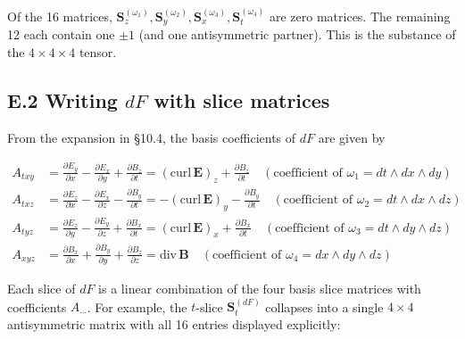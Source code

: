 \documentclass[a4paper,12pt,openany]{book}
\begin{document}
Of the 16 matrices,
\(\mathbf{S}_{z}^{(\omega_1)}, \mathbf{S}_{y}^{(\omega_2)}, \mathbf{S}_{x}^{(\omega_3)}, \mathbf{S}_{t}^{(\omega_4)}\)
are zero matrices. The remaining 12 each contain one \(\pm1\) (and one
antisymmetric partner). This is the substance of the \(4\times4\times4\)
tensor.

\hypertarget{e.2-writing-df-with-slice-matrices}{%
\subsection*{\texorpdfstring{E.2 Writing \(dF\) with slice
matrices}{E.2 Writing dF with slice matrices}}\label{e.2-writing-df-with-slice-matrices}}

From the expansion in §10.4, the basis coefficients of \(dF\) are given
by

\[
\begin{aligned}
A_{txy} &= \frac{\partial E_y}{\partial x} - \frac{\partial E_x}{\partial y} + \frac{\partial B_z}{\partial t} = (\mathrm{curl}\,\mathbf{E})_z + \frac{\partial B_z}{\partial t}
\quad (\text{coefficient of } \omega_1 = dt\wedge dx\wedge dy) \\[6pt]
A_{txz} &= \frac{\partial E_z}{\partial x} - \frac{\partial E_x}{\partial z} - \frac{\partial B_y}{\partial t} = -(\mathrm{curl}\,\mathbf{E})_y - \frac{\partial B_y}{\partial t}
\quad (\text{coefficient of } \omega_2 = dt\wedge dx\wedge dz) \\[6pt]
A_{tyz} &= \frac{\partial E_z}{\partial y} - \frac{\partial E_y}{\partial z} + \frac{\partial B_x}{\partial t} = (\mathrm{curl}\,\mathbf{E})_x + \frac{\partial B_x}{\partial t}
\quad (\text{coefficient of } \omega_3 = dt\wedge dy\wedge dz) \\[6pt]
A_{xyz} &= \frac{\partial B_x}{\partial x} + \frac{\partial B_y}{\partial y} + \frac{\partial B_z}{\partial z} = \mathrm{div}\,\mathbf{B}
\quad (\text{coefficient of } \omega_4 = dx\wedge dy\wedge dz)
\end{aligned}
\]

Each slice of \(dF\) is a linear combination of the four basis slice
matrices with coefficients \(A_{\cdots}\). For example, the \(t\)-slice
\(\mathbf{S}_{t}^{(dF)}\) collapses into a single \(4\times4\)
antisymmetric matrix with all 16 entries displayed explicitly:
\end{document}
